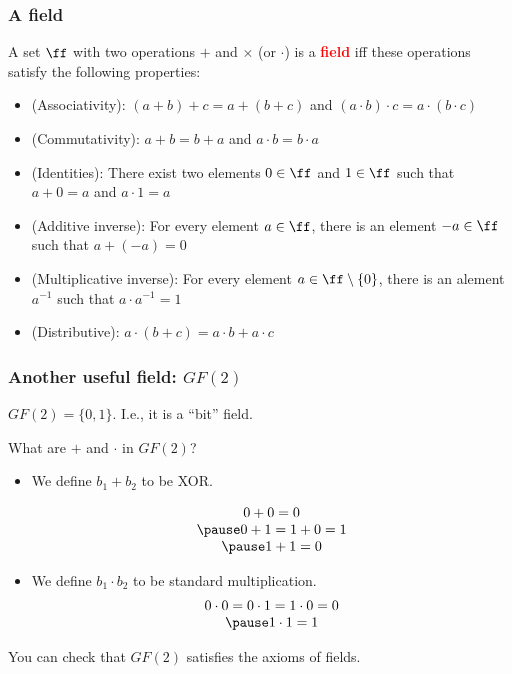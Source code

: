 \begin{frame}
  \frametitle{A field}

  A set $\ff$ with two operations $+$ and $\times$ (or $\cdot$) is a
  \textcolor{red}{\bf field} iff these operations satisfy the
  following properties:
  \begin{itemize}
    \pause
  \item (Associativity): $(a+b)+c = a+(b+c)$ and $(a\cdot b)\cdot c = a\cdot(b\cdot c)$
    \pause
  \item (Commutativity): $a+b=b+a$ and $a\cdot b=b\cdot a$
    \pause
  \item (Identities): There exist two elements $0\in\ff$ and $1\in\ff$ such that $a+0 = a$ and $a\cdot 1 = a$
    \pause
  \item (Additive inverse): For every element $a\in \ff$, there is an element $-a\in \ff$ such that $a+(-a) = 0$
    \pause
  \item (Multiplicative inverse): For every element $a\in \ff\setminus\{0\}$, there is an alement $a^{-1}$ such that $a\cdot a^{-1}=1$
    \pause
  \item (Distributive): $a\cdot(b+c)=a\cdot b + a\cdot c$
  \end{itemize}
\end{frame}

\begin{frame}
  \frametitle{Another useful field: $GF(2)$}
  $GF(2) = \{0,1\}$.  I.e., it is a ``bit'' field.

  What are $+$ and $\cdot$ in $GF(2)$?

  \pause

  \begin{itemize}
  \item We define $b_1+b_2$ to be XOR.
    \pause

    \[
    \begin{array}{c}
      0 + 0 = 0 \\ \pause
      0 + 1 = 1 + 0 = 1 \\ \pause
      1 + 1 = 0
    \end{array}
    \] \pause
  \item We define $b_1\cdot b_2$ to be standard multiplication.
    \pause
    \[
    \begin{array}{c}
      0 \cdot 0 = 0\cdot 1 = 1\cdot 0 = 0 \\ \pause
      1\cdot 1 = 1
    \end{array}
    \] 
    
  \end{itemize}

  \pause

  You can check that $GF(2)$ satisfies the axioms of fields.
\end{frame}

